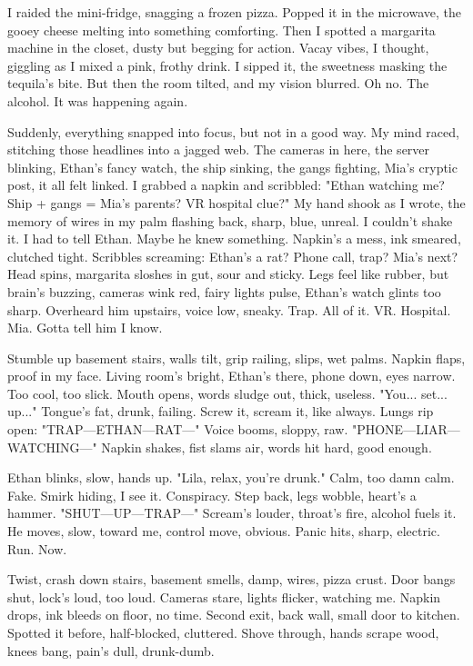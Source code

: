 \documentclass{article}
\begin{document}
I raided the mini-fridge, snagging a frozen pizza. Popped it in the microwave, the gooey cheese melting into something comforting. Then I spotted a margarita machine in the closet, dusty but begging for action. Vacay vibes, I thought, giggling as I mixed a pink, frothy drink. I sipped it, the sweetness masking the tequila's bite. But then the room tilted, and my vision blurred. Oh no. The alcohol. It was happening again.

Suddenly, everything snapped into focus, but not in a good way. My mind raced, stitching those headlines into a jagged web. The cameras in here, the server blinking, Ethan's fancy watch, the ship sinking, the gangs fighting, Mia's cryptic post, it all felt linked. I grabbed a napkin and scribbled: "Ethan watching me? Ship + gangs = Mia's parents? VR hospital clue?" My hand shook as I wrote, the memory of wires in my palm flashing back, sharp, blue, unreal. I couldn't shake it. I had to tell Ethan. Maybe he knew something. Napkin's a mess, ink smeared, clutched tight. Scribbles screaming: Ethan's a rat? Phone call, trap? Mia's next? Head spins, margarita sloshes in gut, sour and sticky. Legs feel like rubber, but brain's buzzing, cameras wink red, fairy lights pulse, Ethan's watch glints too sharp. Overheard him upstairs, voice low, sneaky. Trap. All of it. VR. Hospital. Mia. Gotta tell him I know.

Stumble up basement stairs, walls tilt, grip railing, slips, wet palms. Napkin flaps, proof in my face. Living room's bright, Ethan's there, phone down, eyes narrow. Too cool, too slick. Mouth opens, words sludge out, thick, useless. "You... set... up..." Tongue's fat, drunk, failing. Screw it, scream it, like always. Lungs rip open: "TRAP—ETHAN—RAT—" Voice booms, sloppy, raw. "PHONE—LIAR—WATCHING—" Napkin shakes, fist slams air, words hit hard, good enough.

Ethan blinks, slow, hands up. "Lila, relax, you're drunk." Calm, too damn calm. Fake. Smirk hiding, I see it. Conspiracy. Step back, legs wobble, heart's a hammer. "SHUT—UP—TRAP—" Scream's louder, throat's fire, alcohol fuels it. He moves, slow, toward me, control move, obvious. Panic hits, sharp, electric. Run. Now.

Twist, crash down stairs, basement smells, damp, wires, pizza crust. Door bangs shut, lock's loud, too loud. Cameras stare, lights flicker, watching me. Napkin drops, ink bleeds on floor, no time. Second exit, back wall, small door to kitchen. Spotted it before, half-blocked, cluttered. Shove through, hands scrape wood, knees bang, pain's dull, drunk-dumb.
\end{document}
